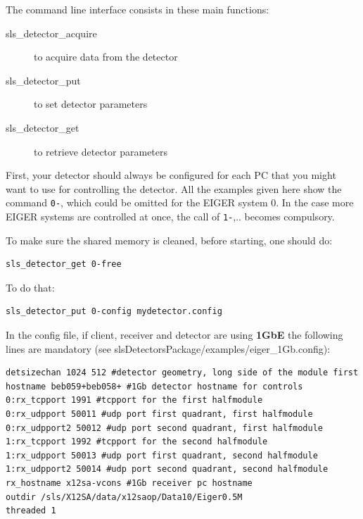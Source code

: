 \documentclass{article}
\begin{document}
The command line interface consists in these main functions:
\begin{description}
\item[sls\_detector\_acquire] to acquire data from the detector
\item[sls\_detector\_put] to set detector parameters
\item[sls\_detector\_get] to retrieve detector parameters
\end{description}

First, your detector should always be configured for each PC that you might want to use for controlling the detector. All the examples given here show the command {\tt{0-}}, which could be omitted for the EIGER system $0$. In the case more EIGER systems are controlled at once, the call of {\tt{1-}},.. becomes compulsory. 

To make sure the shared memory is cleaned, before starting, one should do:  
\begin{verbatim}
sls_detector_get 0-free
\end{verbatim}
To do that:
\begin{verbatim}
sls_detector_put 0-config mydetector.config
\end{verbatim}

In the config file, if client, receiver and detector are using \textbf{1GbE} the following lines are mandatory (see slsDetectorsPackage/examples/eiger\_1Gb.config):
\begin{verbatim}
detsizechan 1024 512 #detector geometry, long side of the module first
hostname beb059+beb058+ #1Gb detector hostname for controls
0:rx_tcpport 1991 #tcpport for the first halfmodule                 
0:rx_udpport 50011 #udp port first quadrant, first halfmodule         
0:rx_udpport2 50012 #udp port second quadrant, first halfmodule       
1:rx_tcpport 1992 #tcpport for the second halfmodule               
1:rx_udpport 50013 #udp port first quadrant, second halfmodule       
1:rx_udpport2 50014 #udp port second quadrant, second halfmodule      
rx_hostname x12sa-vcons #1Gb receiver pc hostname
outdir /sls/X12SA/data/x12saop/Data10/Eiger0.5M
threaded 1
\end{verbatim}
\end{document}
